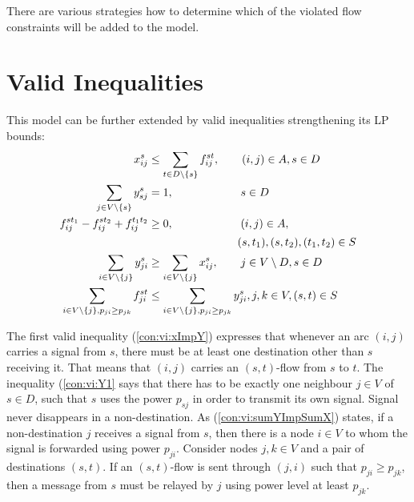 There are various strategies how to determine which of the violated flow constraints will be added to the model. 

\section{Valid Inequalities}
This model can be further extended by valid inequalities strengthening its LP bounds:
  \begin{subequations}
  \begin{flalign}
\label{con:vi:xImpY}  x^{s}_{ij} & \leq \sum\limits_{t\in D\setminus\{s\}}  f^{st}_{ij},  \quad\quad    (i,j)\in A,s\in D \\
 \label{con:vi:Y1}  \sum\limits_{j\in V\setminus\{s\}}  y^{s}_{sj} & =1,  \quad\quad\quad\quad\quad\quad    s\in D \\
\notag\label{con:vi:f2dest}  f^{st_1}_{ij}-f^{st_2}_{ij}+f^{t_1t_2}_{ij} & \geq 0, \quad\quad\quad\quad\quad\quad (i,j) \in A, \\  & \quad\quad\quad\quad\quad\quad\quad\quad(s,t_1),(s,t_2),(t_1,t_2)\in S \\
\label{con:vi:sumYImpSumX} \sum\limits_{i\in V\setminus\{j\} }y^{s}_{ji} & \geq \sum\limits_{i\in V\setminus\{j\}}  x^{s}_{ij},   \quad\quad   j\in V\setminus D, s\in D \\
\label{con:vi:sumFImpSumY} \sum\limits_{i\in V\setminus\{j\}, p_{ji}\geq p_{jk}  }f^{st}_{ji} & \leq \sum\limits_{i\in V\setminus\{j\}, p_{ji}\geq p_{jk}}  y^{s}_{ji},   j,k\in V, (s,t)\in S
                      \end{flalign}
  \end{subequations}
  
The first valid inequality (\ref{con:vi:xImpY}) expresses that whenever an arc $(i,j)$ carries a signal from $s$, there must be at least one destination other than $s$ receiving it. That means that $(i,j)$ carries an $(s,t)$-flow from $s$ to $t$. The inequality (\ref{con:vi:Y1} says that there has to be exactly one neighbour $j\in V$ of $s\in D$, such that $s$ uses the power $p_{sj}$ in order to transmit its own signal. Signal never disappears in a non-destination. As (\ref{con:vi:sumYImpSumX}) states, if a non-destination $j$ receives a signal from $s$, then there is a node $i\in V$ to whom the signal is forwarded using power $p_{ji}$. Consider nodes $j,k\in V$ and a pair of destinations $(s,t)$. If an $(s,t)$-flow is sent through $(j,i)$ such that $p_{ji}\geq p_{jk}$, then a message from $s$ must be relayed by $j$ using power level at least $p_{jk}$.
